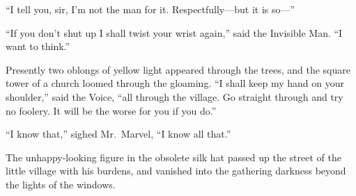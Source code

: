 “I tell you, sir, I’m not the man for it. Respectfully—but it is so—”

“If you don’t shut up I shall twist your wrist again,” said the Invisible Man. “I want to think.”

Presently two oblongs of yellow light appeared through the trees, and the square tower of a church loomed through the gloaming. “I shall keep my hand on your shoulder,” said the Voice, “all through the village. Go straight through and try no foolery. It will be the worse for you if you do.”

“I know that,” sighed Mr.\ Marvel, “I know all that.”

The unhappy-looking figure in the obsolete silk hat passed up the street of the little village with his burdens, and vanished into the gathering darkness beyond the lights of the windows.